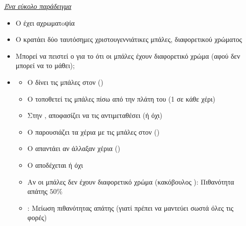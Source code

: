 \documentclass[handout]{beamer}
\begin{document}
\begin{frame}{\textit{\href{http://mathoverflow.net/questions/22624/example-of-a-good-zero-knowledge-proof}{Ένα εύκολο παράδειγμα}}}
\begin{itemize}
\item Ο \ver έχει αχρωματoψία
\pause
\item O \prv κρατάει δύο ταυτόσημες χριστουγεννιάτικες μπάλες, διαφορετικού χρώματος
\pause
\item Μπορεί να πειστεί ο \ver για το ότι οι μπάλες έχουν διαφορετικό χρώμα (\alert{αφού δεν μπορεί να το μάθει});
\pause
\item {}
\begin{itemize}
\item Ο \prv δίνει τις μπάλες στον \ver ()
\item Ο \ver τοποθετεί τις μπάλες πίσω από την πλάτη του (1 σε κάθε χέρι)
\pause
\item Στην , αποφασίζει να τις αντιμεταθέσει (ή όχι)
\pause
\item O \ver παρουσιάζει τα χέρια με τις μπάλες στον \prv ()
\pause
\item Ο \prv απαντάει αν άλλαξαν χέρια ()
\pause
\item Ο \ver αποδέχεται ή όχι
\pause
\item Αν οι μπάλες \alert{δεν} έχουν διαφορετικό χρώμα (κακόβουλος \prv): Πιθανότητα απάτης $50\%$
\pause
\item {}: Μείωση πιθανότητας απάτης (γιατί πρέπει να μαντεύει σωστά όλες τις φορές)
\end{itemize}
\end{itemize}
\end{frame}
\end{document}
